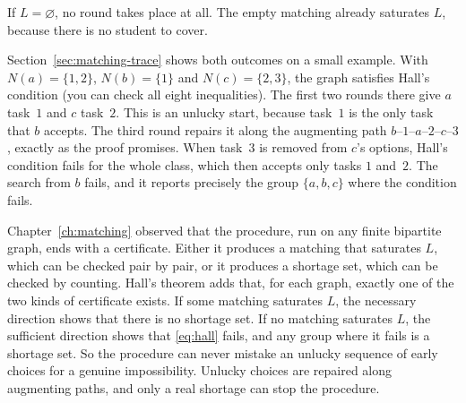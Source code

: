 If $L=\varnothing$, no round takes place at all. The empty matching already saturates $L$, because there is no student to cover.

Section~\ref{sec:matching-trace} shows both outcomes on a small example. With $N(a)=\{1,2\}$, $N(b)=\{1\}$ and $N(c)=\{2,3\}$, the graph satisfies Hall's condition (you can check all eight inequalities). The first two rounds there give $a$ task~$1$ and $c$ task~$2$. This is an unlucky start, because task~$1$ is the only task that $b$ accepts. The third round repairs it along the augmenting path $b$--$1$--$a$--$2$--$c$--$3$, exactly as the proof promises. When task~$3$ is removed from $c$'s options, Hall's condition fails for the whole class, which then accepts only tasks $1$ and~$2$. The search from $b$ fails, and it reports precisely the group $\{a,b,c\}$ where the condition fails.

Chapter~\ref{ch:matching} observed that the procedure, run on any finite bipartite graph, ends with a certificate. Either it produces a matching that saturates $L$, which can be checked pair by pair, or it produces a shortage set, which can be checked by counting. Hall's theorem adds that, for each graph, exactly one of the two kinds of certificate exists. If some matching saturates $L$, the necessary direction shows that there is no shortage set. If no matching saturates $L$, the sufficient direction shows that \eqref{eq:hall} fails, and any group where it fails is a shortage set. So the procedure can never mistake an unlucky sequence of early choices for a genuine impossibility. Unlucky choices are repaired along augmenting paths, and only a real shortage can stop the procedure.
